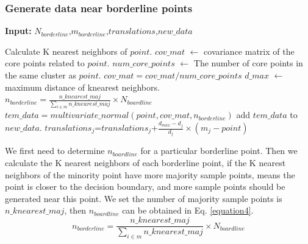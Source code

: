 \documentclass[runningheads]{llncs}
\begin{document}
\subsubsection{Generate data near borderline points}
\vspace{-0.5cm}
\begin{algorithm}[tb]
  \caption{$generate\_borderline$}
  \label{alg3}
  \hspace*{0.02in} {\bf Input:} %
   $N_{borderline}$,$m_{borderline}$,$translations$,$new\_data$
  \begin{algorithmic}
      \State Calculate K nearest neighbors of $point$.
      \State $cov\_mat$ $\leftarrow$ covariance matrix of the core points related to $point$.
      \State $num\_core\_points$ $\leftarrow$ The number of core points in the same cluster as $point$.
      \State $cov\_mat=cov\_mat/num\_core\_points$
      \State $d\_max$ $\leftarrow$ maximum distance of knearest neighbors.
  　　 \State $n_{borderline}=\frac{n\_knearest\_maj}{\sum_{i\in m} n\_knearest\_maj}\times N_{boardline}$
      \State $tem\_data=multivariate\_normal(point,cov\_mat,n_{borderline})$
      \State add $tem\_data$ to $new\_data$.
        \State $translations_j$=$translations_j$+$\frac{d_{max}-d_{j}}{d_{j}}\times (m_{j}-point)$
      \EndFor
  \EndFor
  \end{algorithmic}
\end{algorithm}
We first need to determine $n_{boardline}$ for a particular borderline point.
Then we calculate the K nearest neighbors of each borderline point, 
if the K nearest neighbors of the minority point have more majority sample points, 
means the point 
is closer to the decision boundary, and more sample points should be generated near this point.
We set the number of majority sample points is $n\_knearest\_maj$,
then $n_{boardline}$ can be obtained in Eq. \ref{equation4}.
\begin{equation}
  \label{equation4}
  n_{borderline}=\frac{n\_knearest\_maj}{\sum_{i\in m} n\_knearest\_maj}\times N_{boardline}
\end{equation}
\end{document}
